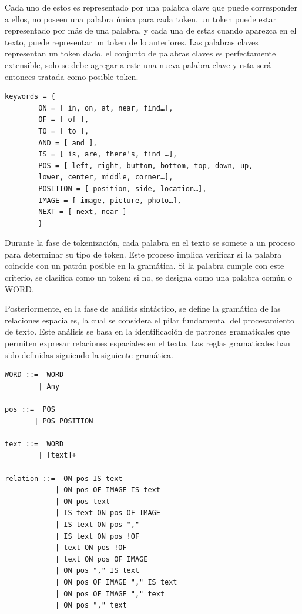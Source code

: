 Cada uno de estos es representado por una palabra clave que puede corresponder a ellos, no poseen una palabra única para cada token, un token puede estar representado por más de una palabra, y cada una de estas cuando aparezca en el texto, puede representar un token de lo anteriores. Las palabras claves representan un token dado, el conjunto de palabras claves es perfectamente extensible, solo se debe agregar a este una nueva palabra clave y esta ser\'a entonces tratada como posible token.

\begin{verbatim}
keywords = {
        ON = [ in, on, at, near, find…],
        OF = [ of ],
        TO = [ to ],
        AND = [ and ],
        IS = [ is, are, there's, find …],
        POS = [ left, right, buttom, bottom, top, down, up, 
        lower, center, middle, corner…],
        POSITION = [ position, side, location…],
        IMAGE = [ image, picture, photo…],
        NEXT = [ next, near ]
        }
\end{verbatim}

Durante la fase de tokenización, cada palabra en el texto se somete a un proceso para determinar su tipo de token. Este proceso implica verificar si la palabra coincide con un patrón posible en la gramática. Si la palabra cumple con este criterio, se clasifica como un token; si no, se designa como una palabra común o WORD.

Posteriormente, en la fase de análisis sintáctico, se define la gramática de las relaciones espaciales, la cual se considera el pilar fundamental del procesamiento de texto. Este análisis se basa en la identificación de patrones gramaticales que permiten expresar relaciones espaciales en el texto. Las reglas gramaticales han sido definidas siguiendo la siguiente gram\'atica.
 
\begin{verbatim}
WORD ::=  WORD
        | Any
    
pos ::=  POS
       | POS POSITION 

text ::=  WORD
        | [text]+
        
relation ::=  ON pos IS text
            | ON pos OF IMAGE IS text
            | ON pos text
            | IS text ON pos OF IMAGE
            | IS text ON pos ","
            | IS text ON pos !OF
            | text ON pos !OF
            | text ON pos OF IMAGE
            | ON pos "," IS text
            | ON pos OF IMAGE "," IS text
            | ON pos OF IMAGE "," text
            | ON pos "," text
\end{verbatim}

